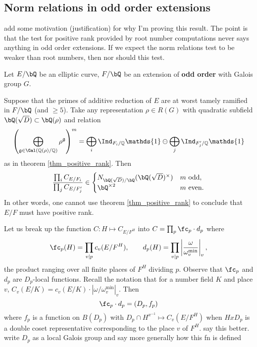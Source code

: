 \subsection{Norm relations in odd order extensions}

{\color{red} add some motivation (justification) for why I'm proving this result. The point is that the test for positive rank provided by root number computations never says anything in odd order extensions. If we expect the norm relations test to be weaker than root numbers, then nor should this test.}

\begin{thm}\label{odd-exts}
 Let $E / \bQ$ be an elliptic curve, $F / \bQ$ be an extension of \textbf{odd order} with Galois group $G$. 
 
Suppose that the primes of additive reduction of $E$ are at worst tamely ramified in $F / \bQ$ (and $\geq 5$). 
Take any representation $\rho \in R(G)$ with quadratic subfield $\bQ(\sqrt{D}) \subset \bQ(\rho)$ and relation
\begin{equation*}\label{odd-exp}
 \left(\bigoplus_{\mathfrak{g}\in\Gal(\QQ(\rho)/\QQ)}\rho^{\mathfrak{g}}\right)^m=\bigoplus_i\Ind_{F_i/\QQ}\mathds{1}\ominus\bigoplus_j\Ind_{F'_j/\QQ}\mathds{1}
\end{equation*}
 as in theorem \ref{thm_positive_rank}. Then
 \[ \frac{\prod_i C_{E/F_i}}{\prod_j C_{E/F_j'}}  \in 
    \begin{cases}
        N_{\bQ(\sqrt{D}) / \bQ}(\bQ(\sqrt{D})^{\times}) & m \ \text{odd}, \\
        \bQ^{\times 2} & m \ \text{even}.
    \end{cases} \] 
    In other words, one cannot use theorem \ref{thm_positive_rank} to conclude that $E / F$ must have positive rank. 
\end{thm}
Let us break up the function $C \colon H \mapsto C_{E / F^H}$ into $C = \prod_p  \fc_p \cdot d_p$ where
\begin{equation}\label{c-and-d}
         \fc_p(H) = \prod_{v | p}  c_v(E / F^H) , \qquad d_p(H) = \prod_{v | p} \left|\frac{\omega}{\omega_{v}^{\min}}\right|_v, 
\end{equation}
the product ranging over all finite places of $F^H$ dividing $p$.
Observe that $\fc_p$ and $d_p$ are $D_p$-local functions. Recall the notation that for a number field $K$ and place $v$, $C_v(E / K) = c_v(E / K) \cdot \left| \omega / \omega_v^{\min} \right|_v.$ 
Then
\begin{equation}\label{Dp-loc}
\fc_p \cdot d_p = (D_p, f_p)
\end{equation}
where $f_p$ is a function on $B(D_p)$ with $D_p \cap H^{x^{-1}} \mapsto C_v(E / F^H)$ when $HxD_p$ is a double coset representative corresponding to the place $v$ of $F^H$. {\color{red} say this better. write $D_p$ as a local Galois group and say more generally how this fn is defined}

